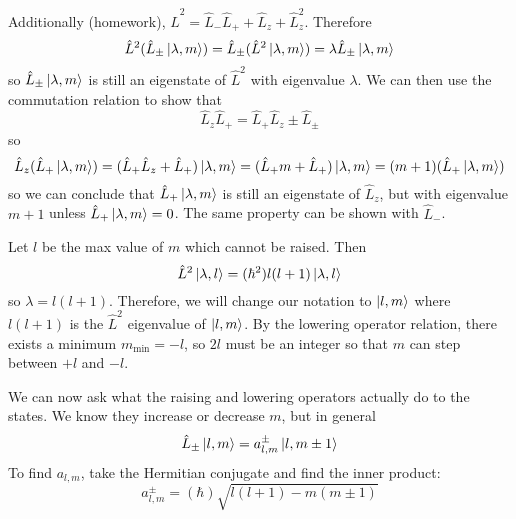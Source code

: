 \documentclass[a4paper,twoside,master.tex]{subfiles}
\begin{document}
Additionally (homework), $ \hat{L}^2 = \hat{L}_- \hat{L}_+ + \hat{L}_z + \hat{L}_z^2 $. Therefore
\begin{equation}
    \hat{L}^2 (\hat{L}_{\pm}\ket{\lambda, m}) = \hat{L}_{\pm} (\hat{L}^2\ket{\lambda, m}) = \lambda \hat{L}_{\pm}\ket{\lambda, m}
\end{equation}
so $ \hat{L}_{\pm}\ket{\lambda, m} $ is still an eigenstate of $ \hat{L}^2 $ with eigenvalue $ \lambda $. We can then use the commutation relation to show that
\begin{equation}
    \hat{L}_z \hat{L}_+ = \hat{L}_+ \hat{L}_z \pm \hat{L}_{\pm}
\end{equation}
so
\begin{equation}
    \hat{L}_z (\hat{L}_+\ket{\lambda, m}) = (\hat{L}_+ \hat{L}_z + \hat{L}_+)\ket{\lambda, m} = (\hat{L}_+ m + \hat{L}_+)\ket{\lambda, m} = (m + 1)(\hat{L}_+\ket{\lambda, m})
\end{equation}
so we can conclude that $ \hat{L}_+\ket{\lambda, m} $ is still an eigenstate of $ \hat{L}_z $, but with eigenvalue $ m + 1 $ unless $ \hat{L}_+\ket{\lambda, m} = 0 $. The same property can be shown with $ \hat{L}_- $. 

Let $ l $ be the max value of $ m $ which cannot be raised. Then
\begin{equation}
    \hat{L}^2\ket{\lambda, l} = (\hbar^2)l(l + 1)\ket{\lambda, l}
\end{equation}
so $ \lambda = l(l+1) $. Therefore, we will change our notation to $\ket{l,m} $ where $ l(l+1) $ is the $ \hat{L}^2 $ eigenvalue of $\ket{l,m} $. By the lowering operator relation, there exists a minimum $ m_{\text{min}} = -l $, so $ 2l $ must be an integer so that $ m $ can step between $ +l $ and $ -l $.

We can now ask what the raising and lowering operators actually do to the states. We know they increase or decrease $ m $, but in general
\begin{equation}
    \hat{L}_{\pm}\ket{l,m} = a_{l,m}^{\pm}\ket{l,m\pm1}
\end{equation}
To find $ a_{l,m} $, take the Hermitian conjugate and find the inner product:
\begin{equation}
    a_{l,m}^{\pm} = (\hbar) \sqrt{l(l+1) - m(m\pm 1)}
\end{equation}
\end{document}
